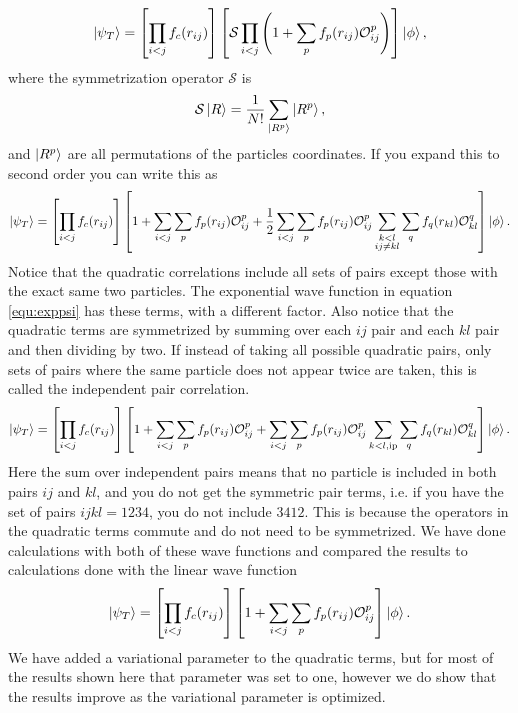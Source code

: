 \begin{equation}
   \left| \psi_T \right> = \left[\prod\limits_{i<j}f_c(r_{ij})\right] \left[\mathcal{S}\prod\limits_{i<j}\left(1+\sum\limits_pf_p(r_{ij})\mathcal{O}_{ij}^p\right)\right] \left| \phi \right>,
   \label{equ:prodpsi}
\end{equation}
where the symmetrization operator $\mathcal{S}$ is
\begin{equation}
   \mathcal{S}\left| R \right> = \frac{1}{N!} \sum\limits_{\left| R^p \right>} \left| R^p \right>,
\end{equation}
and $\left| R^p \right>$ are all permutations of the particles coordinates. If you expand this to second order you can write this as
\begin{equation}
   \left| \psi_T \right> = \left[\prod\limits_{i<j}f_{c}(r_{ij})\right] \left[1+\sum\limits_{i<j}\sum\limits_p f_p(r_{ij})\mathcal{O}_{ij}^p+\frac{1}{2}\sum\limits_{i<j}\sum\limits_p f_p(r_{ij})\mathcal{O}_{ij}^p\sum_{\substack{k<l\\ij \ne kl}}\sum\limits_q f_q(r_{kl})\mathcal{O}_{kl}^q\right] \left| \phi \right>.
\end{equation}
Notice that the quadratic correlations include all sets of pairs except those with the exact same two particles. The exponential wave function in equation \ref{equ:exppsi} has these terms, with a different factor. Also notice that the quadratic terms are symmetrized by summing over each $ij$ pair and each $kl$ pair and then dividing by two. If instead of taking all possible quadratic pairs, only sets of pairs where the same particle does not appear twice are taken, this is called the independent pair correlation.
\begin{equation}
   \left| \psi_T \right> = \left[\prod\limits_{i<j}f_{c}(r_{ij})\right] \left[1+\sum\limits_{i<j}\sum\limits_p f_p(r_{ij})\mathcal{O}_{ij}^p+\sum\limits_{i<j}\sum\limits_p f_p(r_{ij})\mathcal{O}_{ij}^p\sum\limits_{k<l,\mathrm{ip}}\sum\limits_q f_q(r_{kl})\mathcal{O}_{kl}^q\right] \left| \phi \right>.
\end{equation}
Here the sum over independent pairs means that no particle is included in both pairs $ij$ and $kl$, and you do not get the symmetric pair terms, i.e. if you have the set of pairs $ijkl=1234$, you do not include $3412$. This is because the operators in the quadratic terms commute and do not need to be symmetrized. We have done calculations with both of these wave functions and compared the results to calculations done with the linear wave function
\begin{equation}
   \left| \psi_T \right> = \left[\prod\limits_{i<j}f_c(r_{ij})\right] \left[1+\sum\limits_{i<j}\sum\limits_p f_p(r_{ij})\mathcal{O}_{ij}^p\right] \left| \phi \right>.
\end{equation}
We have added a variational parameter to the quadratic terms, but for most of the results shown here that parameter was set to one, however we do show that the results improve as the variational parameter is optimized.












